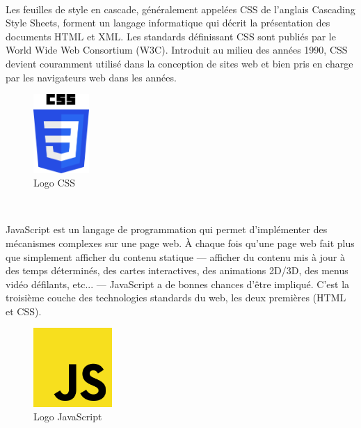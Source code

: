 \\ \par 
Les feuilles de style en cascade, généralement appelées CSS de l'anglais Cascading Style Sheets, forment un langage informatique qui décrit la présentation des documents HTML et XML. Les standards définissant CSS sont publiés par le World Wide Web Consortium (W3C). Introduit au milieu des années 1990, CSS devient couramment utilisé dans la conception de sites web et bien pris en charge par les navigateurs web dans les années.
\\
\begin{figure}[!h]
\begin{center}
\includegraphics[height=3cm]{Pictures/css.png}
\end{center}
\caption{Logo CSS}
\end{figure}

\\ \par 
JavaScript est un langage de programmation qui permet d’implémenter des mécanismes complexes sur une page web. À chaque fois qu’une page web fait plus que simplement afficher du contenu statique — afficher du contenu mis à jour à des temps déterminés, des cartes interactives, des animations 2D/3D, des menus vidéo défilants, etc... — JavaScript a de bonnes chances d’être impliqué. C’est la troisième couche des technologies standards du web, les deux premières (HTML et CSS).
\\
\begin{figure}[!h]
\begin{center}
\includegraphics[height=3cm]{Pictures/js.png}
\end{center}
\caption{Logo JavaScript}
\end{figure}


